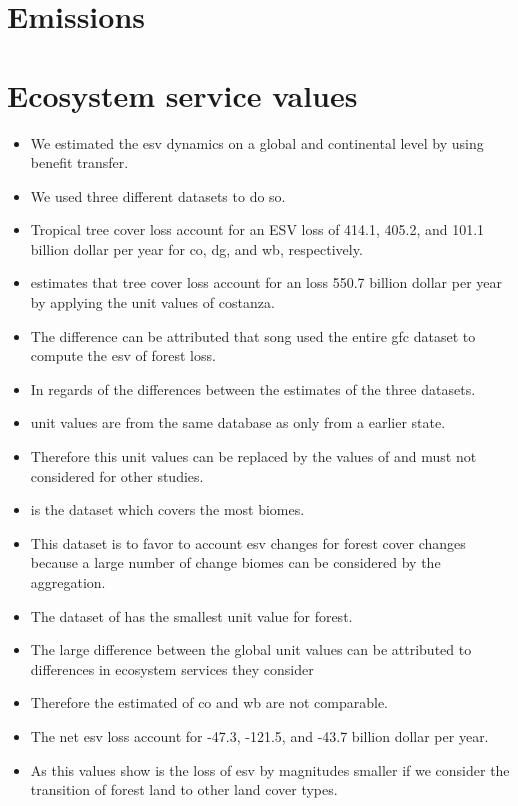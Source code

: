 	\section{Emissions}

	\section{Ecosystem service values}
		\begin{itemize}
			\item We estimated the esv dynamics on a global and continental level by using benefit transfer. 
			\item We used three different datasets to do so.
			\item Tropical tree cover loss account for an \ac{ESV} loss of 414.1, 405.2, and 101.1 billion dollar per year for co, dg, and wb, respectively.
			\item \citep{Song2018} estimates that tree cover loss account for an loss 550.7 billion dollar per year by applying the unit values of costanza.
			\item The difference can be attributed that song used the entire gfc dataset to compute the esv of forest loss.
			\item In regards of the differences between the estimates of the three datasets.
			\item \citep{Groot2012} unit values are from the same database as \citep{Costanza2014} only from a earlier state.
			\item Therefore this unit values can be replaced by the values of \citep{Costanza2014} and must not considered for other studies.
			\item \citep{Costanza2014} is the dataset which covers the most biomes.
			\item This dataset is to favor to account esv changes for forest cover changes because a large number of change biomes can be considered by the aggregation. 
			\item The dataset of \citep{Siikamaki2015} has the smallest unit value for forest.
			\item The large difference between the global unit values can be attributed to differences in ecosystem services they consider
			\item Therefore the estimated of co and wb are not comparable.
			\item The net esv loss account for -47.3, -121.5, and -43.7 billion dollar per year.
			\item As this values show is the loss of esv by magnitudes smaller if we consider the transition of forest land to other land cover types.

\end{itemize}
